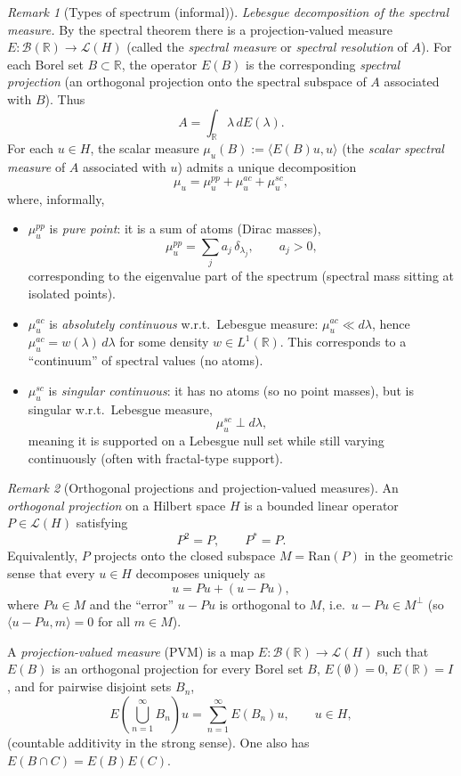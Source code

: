 \documentclass[11pt]{article}
\theoremstyle{definition}
\theoremstyle{remark}
\newtheorem{remark}{Remark}
\begin{document}
\begin{remark}[Types of spectrum (informal)]
\emph{Lebesgue decomposition of the spectral measure.}
By the spectral theorem there is a projection-valued measure $E:\mathcal{B}(\mathbb{R})\to\mathcal{L}(H)$ (called the \emph{spectral measure} or \emph{spectral resolution} of $A$). For each Borel set $B\subset\mathbb{R}$, the operator $E(B)$ is the corresponding \emph{spectral projection} (an orthogonal projection onto the spectral subspace of $A$ associated with $B$). Thus
\[
    A=\int_{\mathbb{R}}\lambda\,dE(\lambda).
\]
	For each $u\in H$, the scalar measure $\mu_u(B):=\langle E(B)u,u\rangle$ (the \emph{scalar spectral measure} of $A$ associated with $u$) admits a unique decomposition
	\[
	    \mu_u = \mu_u^{pp}+\mu_u^{ac}+\mu_u^{sc},
	\]
	where, informally,
	\begin{itemize}
	    \item $\mu_u^{pp}$ is \emph{pure point}: it is a sum of atoms (Dirac masses),
	    \[
	        \mu_u^{pp}=\sum_{j} a_j\,\delta_{\lambda_j},
	        \qquad a_j>0,
	    \]
	    corresponding to the eigenvalue part of the spectrum (spectral mass sitting at isolated points).
	    \item $\mu_u^{ac}$ is \emph{absolutely continuous} w.r.t.\ Lebesgue measure: $\mu_u^{ac}\ll d\lambda$, hence $\mu_u^{ac}=w(\lambda)\,d\lambda$ for some density $w\in L^1(\mathbb{R})$.
	    This corresponds to a ``continuum'' of spectral values (no atoms).
	    \item $\mu_u^{sc}$ is \emph{singular continuous}: it has no atoms (so no point masses), but is singular w.r.t.\ Lebesgue measure,
	    \[
	        \mu_u^{sc}\perp d\lambda,
	    \]
	    meaning it is supported on a Lebesgue null set while still varying continuously (often with fractal-type support).
	\end{itemize}
\end{remark}

\begin{remark}[Orthogonal projections and projection-valued measures]
An \emph{orthogonal projection} on a Hilbert space $H$ is a bounded linear operator $P\in\mathcal{L}(H)$ satisfying
\[
    P^2=P,
    \qquad
    P^*=P.
\]
Equivalently, $P$ projects onto the closed subspace $M=\mathrm{Ran}(P)$ in the geometric sense that every $u\in H$ decomposes uniquely as
\[
    u = Pu + (u-Pu),
\]
where $Pu\in M$ and the ``error'' $u-Pu$ is orthogonal to $M$, i.e.\ $u-Pu\in M^\perp$ (so $\langle u-Pu, m\rangle=0$ for all $m\in M$).
\smallskip

A \emph{projection-valued measure} (PVM) is a map $E:\mathcal{B}(\mathbb{R})\to \mathcal{L}(H)$ such that $E(B)$ is an orthogonal projection for every Borel set $B$, $E(\emptyset)=0$, $E(\mathbb{R})=I$, and for pairwise disjoint sets $B_n$,
\[
    E\!\left(\bigcup_{n=1}^{\infty} B_n\right)u
    =
    \sum_{n=1}^{\infty} E(B_n)u,
    \qquad u\in H,
\]
(countable additivity in the strong sense). One also has $E(B\cap C)=E(B)E(C)$.
\end{remark}
\end{document}
